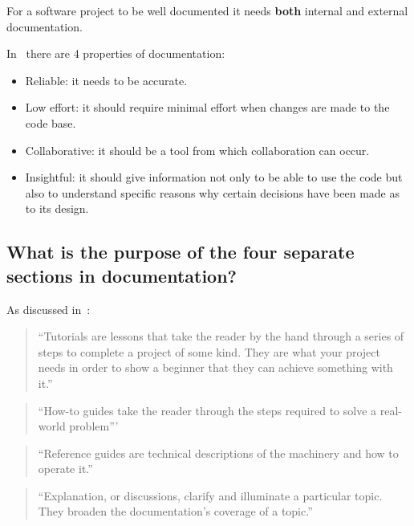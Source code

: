 For a software project to be well documented it needs \textbf{both} internal and
external documentation.


In~\cite{martraire2019living} there are 
4 properties of documentation:
\begin{itemize}
\item 

Reliable: it needs to be accurate.

\item 

Low effort: it should require minimal effort when changes are made to the code
base.

\item 

Collaborative: it should be a tool from which collaboration can occur.

\item 

Insightful: it should give information not only to be able to use the code but
also to understand specific reasons why certain decisions have been made as to
its design.

\end{itemize}


\subsection{What is the purpose of the four separate sections in documentation?}

As discussed in~\cite{Procida_Diataxis_documentation_framework}:
\begin{quote}


``Tutorials are lessons that take the reader by the hand through a series of
steps to complete a project of some kind. They are what your project needs in
order to show a beginner that they can achieve something with it.''
\end{quote}


\begin{quote}
``How-to guides take the reader through the steps required to solve a
real-world problem'''
\end{quote}

\begin{quote}
``Reference guides are technical descriptions of the machinery and how to
operate it.''
\end{quote}

\begin{quote}
``Explanation, or discussions, clarify and illuminate a particular topic. They
broaden the documentation’s coverage of a topic.''
\end{quote}


